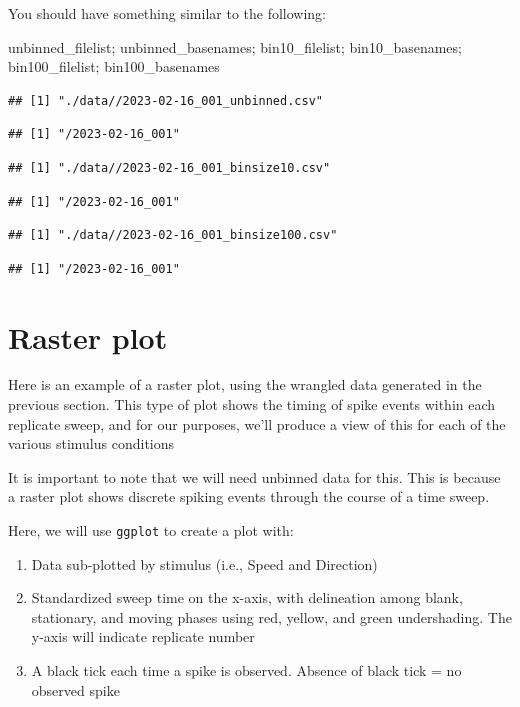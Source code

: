 \documentclass[
]{book}
\newenvironment{Shaded}{\begin{snugshade}}{\end{snugshade}}
\newcommand{\NormalTok}[1]{#1}
\providecommand{\tightlist}{%
  \setlength{\itemsep}{0pt}\setlength{\parskip}{0pt}}
\begin{document}
You should have something similar to the following:

\begin{Shaded}
\begin{Highlighting}[]
\NormalTok{unbinned\_filelist; unbinned\_basenames; bin10\_filelist; bin10\_basenames; bin100\_filelist; bin100\_basenames}
\end{Highlighting}
\end{Shaded}

\begin{verbatim}
## [1] "./data//2023-02-16_001_unbinned.csv"
\end{verbatim}

\begin{verbatim}
## [1] "/2023-02-16_001"
\end{verbatim}

\begin{verbatim}
## [1] "./data//2023-02-16_001_binsize10.csv"
\end{verbatim}

\begin{verbatim}
## [1] "/2023-02-16_001"
\end{verbatim}

\begin{verbatim}
## [1] "./data//2023-02-16_001_binsize100.csv"
\end{verbatim}

\begin{verbatim}
## [1] "/2023-02-16_001"
\end{verbatim}

\hypertarget{raster-plot}{%
\section{Raster plot}\label{raster-plot}}

Here is an example of a raster plot, using the wrangled data generated
in the previous section. This type of plot shows the timing of spike
events within each replicate sweep, and for our purposes, we'll
produce a view of this for each of the various stimulus conditions

It is important to note that we will need unbinned data for this. This
is because a raster plot shows discrete spiking events through the
course of a time sweep.

Here, we will use \texttt{ggplot} to create a plot with:

\begin{enumerate}
\def\labelenumi{\arabic{enumi}.}
\tightlist
\item
  Data sub-plotted by stimulus (i.e., Speed and Direction)
\item
  Standardized sweep time on the x-axis, with delineation among
  blank, stationary, and moving phases using red, yellow, and green
  undershading. The y-axis will indicate replicate number
\item
  A black tick each time a spike is observed. Absence of black tick = no
  observed spike
\end{enumerate}
\end{document}
